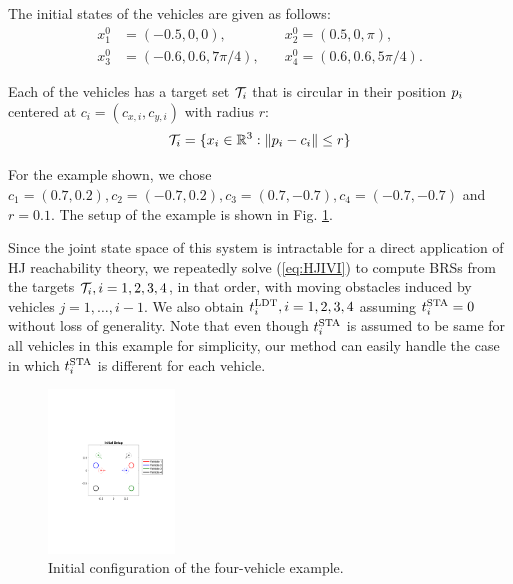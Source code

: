 The initial states of the vehicles are given as follows:
\begin{equation}
\begin{aligned}
x_1^0 &= (-0.5, 0, 0), \quad &x_2^0 = (0.5, 0, \pi), \\
x_3^0 &= \left(-0.6, 0.6, 7\pi/4\right), \quad &x_4^0 = \left(0.6, 0.6, 5\pi/4\right).
\end{aligned}
\end{equation}

\noindent Each of the vehicles has a target set $\mathcal{T}_i$ that is circular in their position $p_i$ centered at $c_i = (c_{x,i}, c_{y,i})$ with radius $r$:
\vspace{-0.2em}
\begin{equation}
\mathcal{T}_i = \{x_i \in \mathbb{R}^3: \|p_i - c_i\| \le r\}
\end{equation}

\noindent For the example shown, we chose $c_1 = (0.7, 0.2), c_2 = (-0.7, 0.2), c_3 = (0.7, -0.7), c_4 = (-0.7, -0.7)$ and $r = 0.1$. The setup of the example is shown in Fig. \ref{fig:init_setup}.

Since the joint state space of this system is intractable for a direct application of HJ reachability theory, we repeatedly solve (\ref{eq:HJIVI}) to compute BRSs from the targets $\mathcal{T}_i, i =1,2,3,4$, in that order, with moving obstacles induced by vehicles $j=1,\ldots,i-1$. We also obtain $t^\text{LDT}_i, i=1,2,3,4$ assuming $t^\text{STA}_i=0$ without loss of generality. Note that even though $t^\text{STA}_i$ is assumed to be same for all vehicles in this example for simplicity, our method can easily handle the case in which $t^\text{STA}_i$ is different for each vehicle.

\begin{figure}
  \centering
  \includegraphics[width=0.30\textwidth]{"fig/init_setup"}
  \caption{Initial configuration of the four-vehicle example.}
  \label{fig:init_setup}
  \vspace{-2em}
\end{figure}


